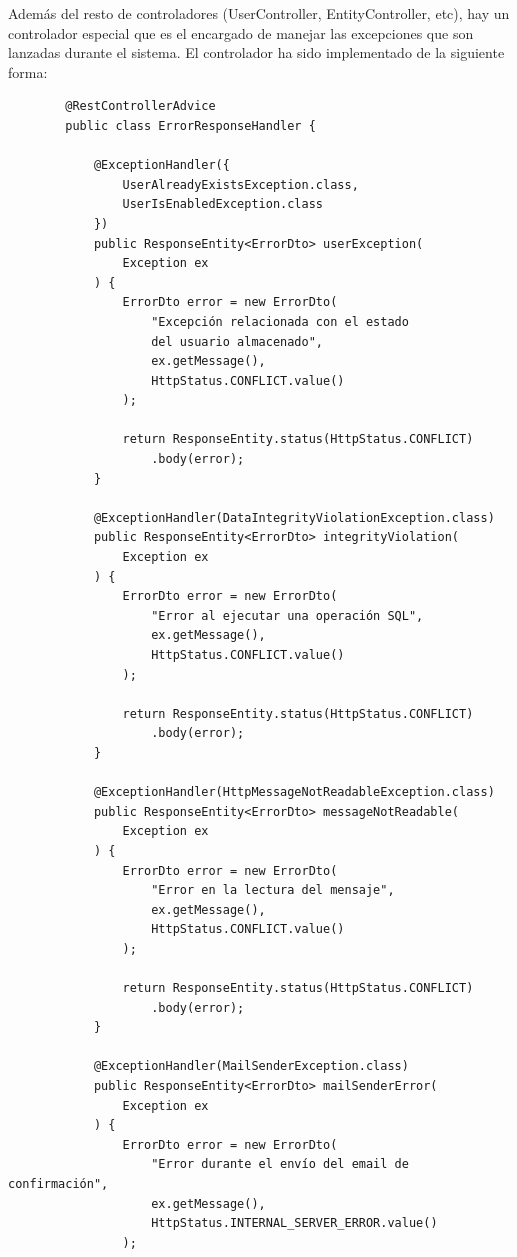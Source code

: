 \begin{itemize}
    Además del resto de controladores (UserController, EntityController, etc), hay un controlador especial que es el encargado de 
    manejar las excepciones que son lanzadas durante el sistema. El controlador ha sido implementado de la siguiente forma:

    \begin{verbatim}
        @RestControllerAdvice
        public class ErrorResponseHandler {

            @ExceptionHandler({
                UserAlreadyExistsException.class,
                UserIsEnabledException.class
            })
            public ResponseEntity<ErrorDto> userException(
                Exception ex
            ) {
                ErrorDto error = new ErrorDto(
                    "Excepción relacionada con el estado 
                    del usuario almacenado", 
                    ex.getMessage(), 
                    HttpStatus.CONFLICT.value()
                );

                return ResponseEntity.status(HttpStatus.CONFLICT)
                    .body(error);
            }

            @ExceptionHandler(DataIntegrityViolationException.class)
            public ResponseEntity<ErrorDto> integrityViolation(
                Exception ex
            ) {
                ErrorDto error = new ErrorDto(
                    "Error al ejecutar una operación SQL", 
                    ex.getMessage(), 
                    HttpStatus.CONFLICT.value()
                );

                return ResponseEntity.status(HttpStatus.CONFLICT)
                    .body(error);
            }
            
            @ExceptionHandler(HttpMessageNotReadableException.class)
            public ResponseEntity<ErrorDto> messageNotReadable(
                Exception ex
            ) {
                ErrorDto error = new ErrorDto(
                    "Error en la lectura del mensaje", 
                    ex.getMessage(), 
                    HttpStatus.CONFLICT.value()
                );

                return ResponseEntity.status(HttpStatus.CONFLICT)
                    .body(error);
            }

            @ExceptionHandler(MailSenderException.class)
            public ResponseEntity<ErrorDto> mailSenderError(
                Exception ex
            ) {
                ErrorDto error = new ErrorDto(
                    "Error durante el envío del email de confirmación", 
                    ex.getMessage(), 
                    HttpStatus.INTERNAL_SERVER_ERROR.value()
                );


\end{verbatim}
\end{itemize}
